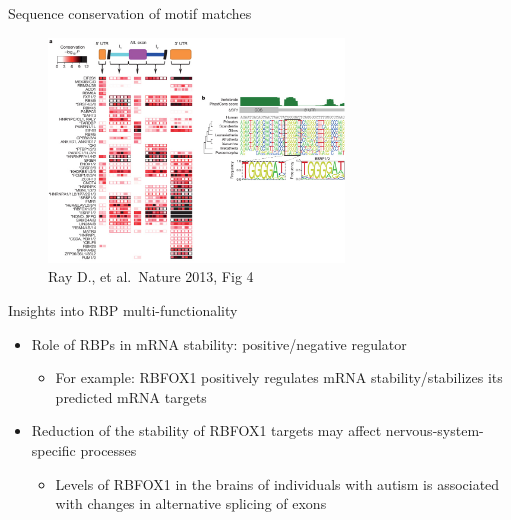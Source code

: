 \documentclass[professionalfont, 12pt, default]{beamer}
\providecommand{\tightlist}{%
    \setlength{\itemsep}{0pt}\setlength{\parskip}{0pt}}
\begin{document}
\begin{frame}{%
\protect\hypertarget{sequence-conservation-of-motif-matches-1}{%
Sequence conservation of motif matches}}

\begin{figure}
\centering
\includegraphics[width=0.7\textwidth,height=\textheight]{img/f4.jpg}
\caption{Ray D., et al.~Nature 2013, Fig 4}
\end{figure}

\end{frame}

\begin{frame}{%
\protect\hypertarget{insights-into-rbp-multi-functionality}{%
Insights into RBP multi-functionality}}

\begin{itemize}
\tightlist
\item
  Role of RBPs in mRNA stability: positive/negative regulator

  \begin{itemize}
  \tightlist
  \item
    For example: RBFOX1 positively regulates mRNA stability/stabilizes
    its predicted mRNA targets
  \end{itemize}
\item
  Reduction of the stability of RBFOX1 targets may affect
  nervous-system-specific processes

  \begin{itemize}
  \tightlist
  \item
    Levels of RBFOX1 in the brains of individuals with autism is
    associated with changes in alternative splicing of exons
  \end{itemize}
\end{itemize}

\end{frame}
\end{document}

